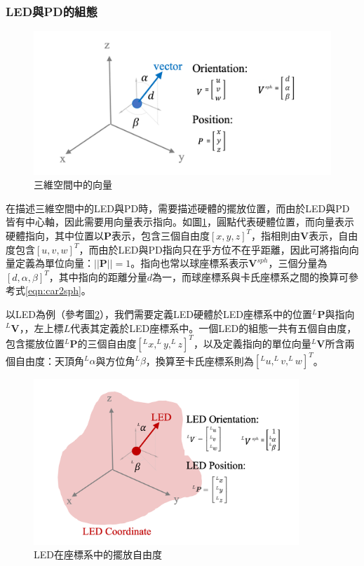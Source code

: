         \subsubsection{LED與PD的組態}
        \label{chp:config}


        \begin{figure}[ht]
            \centering
            \includegraphics[width=12cm]{ch2pic/vec_config.png}
            \caption{三維空間中的向量}
            \label{pic:vec_config}
        \end{figure}

        
        在描述三維空間中的LED與PD時，需要描述硬體的擺放位置，而由於LED與PD皆有中心軸，因此需要用向量表示指向。如圖\ref{pic:vec_config}，圓點代表硬體位置，而向量表示硬體指向，其中位置以$\boldsymbol{P}$表示，包含三個自由度$[x,y,z]^T$，指相則由$\boldsymbol{V}$表示，自由度包含$[u,v,w]^T$，而由於LED與PD指向只在乎方位不在乎距離，因此可將指向向量定義為單位向量：$||\boldsymbol{P}||=1$。指向也常以球座標系表示$\boldsymbol{V}^{sph}$，三個分量為$[d,\alpha,\beta]^T$，其中指向的距離分量$d$為一，而球座標系與卡氏座標系之間的換算可參考式\ref{eqn:car2sph}。
        
        以LED為例（參考圖\ref{pic:led_config}），我們需要定義LED硬體於LED座標系中的位置$^{L}\boldsymbol{P}$與指向$^{L}\boldsymbol{V}$，，左上標$L$代表其定義於LED座標系中。一個LED的組態一共有五個自由度，包含擺放位置$^L \boldsymbol{P}$的三個自由度$[^Lx,^Ly,^Lz]^T$，以及定義指向的單位向量$^L\boldsymbol{V}$所含兩個自由度：天頂角$^L\alpha$與方位角$^L\beta$，換算至卡氏座標系則為$[^Lu,^Lv,^Lw]^T$。

        \begin{figure}[ht]
            \centering
            \includegraphics[width=10cm]{ch2pic/LED_config.png}
            \caption{LED在座標系中的擺放自由度}
            \label{pic:led_config}
        \end{figure}


